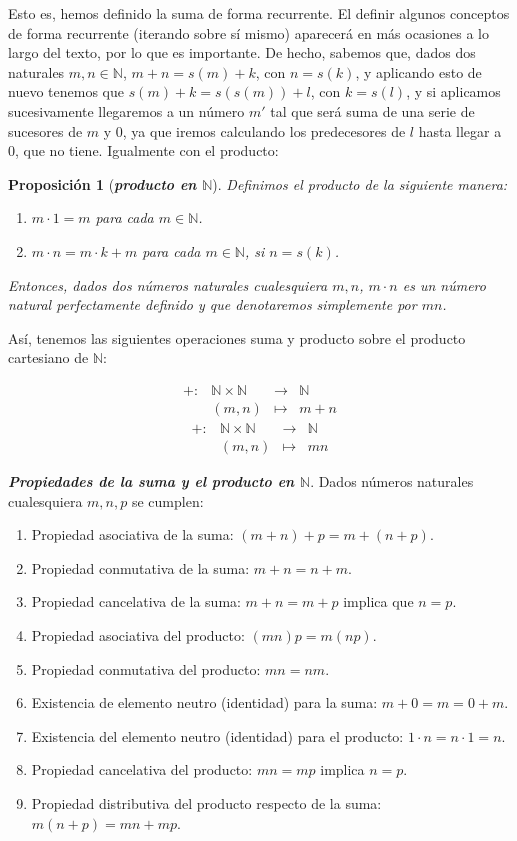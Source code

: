 \documentclass[12pt]{article}
\newtheorem{proposition}[theorem]{Proposición}
\begin{document}
Esto es, hemos definido la suma de forma recurrente. El definir algunos conceptos de forma recurrente (iterando sobre sí mismo) aparecerá en más ocasiones a lo largo del texto, por lo que es importante. De hecho, sabemos que, dados dos naturales $m,n \in \mathbb{N}$, $m+n = s(m) + k$, con $n=s(k)$, y aplicando esto de nuevo tenemos que $s(m) + k= s(s(m)) + l$, con $k=s(l)$, y si aplicamos sucesivamente llegaremos a un número $m'$ tal que será suma de una serie de sucesores de $m$ y $0$, ya que iremos calculando los predecesores de $l$ hasta llegar a $0$, que no tiene. 
\renewcommand{\theenumi}{\arabic{enumi}} 
Igualmente con el producto: 
\begin{proposition}[\textbf{\textit{producto en $\mathbb{N}$}}]Definimos el producto de la siguiente manera: 

\begin{enumerate}
\item $m \cdot 1 = m$ para cada $m \in \mathbb{N}$.
\item $m \cdot n = m\cdot k +m$ para cada $m \in \mathbb{N}$, si $n = s(k)$.
\end{enumerate}
Entonces, dados dos números naturales cualesquiera $m,n$, $m \cdot n$ es un número natural perfectamente definido y que denotaremos simplemente por $mn$.
\end{proposition}

Así, tenemos las siguientes operaciones suma y producto sobre el producto cartesiano de $\mathbb{N}$:

$$\begin{array}{rccl}
+\colon &\mathbb{N}\times \mathbb{N}& \longrightarrow & \mathbb{N}\\
&(m,n)& \longmapsto &m+n
\end{array}
$$
$$\begin{array}{rccl}
+\colon &\mathbb{N}\times \mathbb{N}& \longrightarrow & \mathbb{N}\\
&(m,n)& \longmapsto &mn
\end{array}
$$

\textbf{\textit{Propiedades de la suma y el producto en $\mathbb{N}$}}. Dados números naturales cualesquiera $m,n,p$ se cumplen: 
\begin{enumerate}
\item Propiedad asociativa de la suma: $(m+n)+p=m+(n+p)$.
\item Propiedad conmutativa de la suma: $m+n = n+m$.
\item Propiedad cancelativa de la suma: $m+n = m+p$ implica que $n=p$.
\item Propiedad asociativa del producto: $(mn)p=m(np)$.
\item Propiedad conmutativa del producto: $mn=nm$.
\item Existencia de elemento neutro (identidad) para la suma: $m+0=m=0+m$.
\item Existencia del elemento neutro (identidad) para el producto: $1\cdot n = n \cdot 1 = n$.
\item Propiedad cancelativa del producto: $mn = mp$ implica $n=p$.
\item Propiedad distributiva del producto respecto de la suma: $m(n+p)=mn+mp$.
\end{enumerate}
\end{document}
